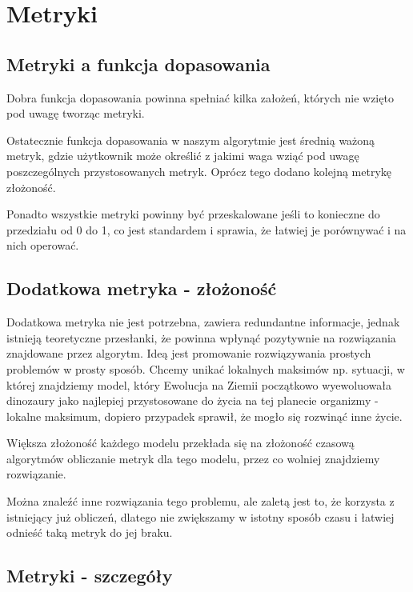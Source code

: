 \section{Metryki}
\label{sec:metryki}

\subsection{Metryki a funkcja dopasowania}

Dobra funkcja dopasowania powinna spełniać kilka założeń, których nie wzięto pod uwagę tworząc metryki. 


Ostatecznie funkcja dopasowania w naszym algorytmie jest średnią ważoną metryk, gdzie użytkownik może określić z jakimi waga wziąć pod uwagę poszczególnych przystosowanych metryk. Oprócz tego dodano kolejną metrykę złożoność.

Ponadto wszystkie metryki powinny być przeskalowane jeśli to konieczne do przedziału od 0 do 1, co jest standardem i sprawia, że łatwiej je porównywać i na nich operować.

\subsection{Dodatkowa metryka - złożoność}
Dodatkowa metryka nie jest potrzebna, zawiera redundantne informacje, jednak istnieją teoretyczne przesłanki, że powinna wpłynąć pozytywnie na rozwiązania znajdowane przez algorytm. 
Ideą jest promowanie rozwiązywania prostych problemów w prosty sposób. Chcemy unikać lokalnych maksimów np. sytuacji, w której znajdziemy model, który 
Ewolucja na Ziemii początkowo wyewoluowała dinozaury jako najlepiej przystosowane do życia na tej planecie organizmy - lokalne maksimum, dopiero przypadek sprawił, że mogło się rozwinąć inne życie.

Większa złożoność każdego modelu przekłada się na złożoność czasową algorytmów obliczanie metryk dla tego modelu, przez co wolniej znajdziemy rozwiązanie.

Można znaleźć inne rozwiązania tego problemu, ale zaletą jest to, że korzysta z istniejący już obliczeń, dlatego nie zwiększamy w istotny sposób czasu i łatwiej odnieść taką metryk do jej braku.

\subsection{Metryki - szczegóły}

